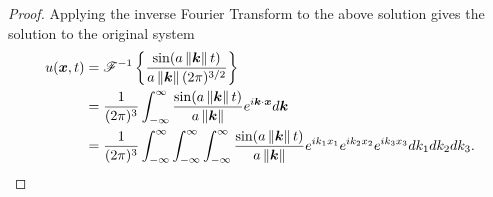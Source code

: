 \begin{proof}
  Applying the inverse Fourier Transform to the above solution gives the solution to the original
  system
  \begin{align*}
    u(\boldsymbol{x}, t) &= \mathscr{F}^{-1}\left\{ {\frac{\sin(a\left\Vert {\boldsymbol{k}} \right\Vert t)}{a\left\Vert {\boldsymbol{k}} \right\Vert(2\pi)^{3/2}}} \right\}\\
    &= \frac{1}{(2\pi)^3}\int_{-\infty}^\infty \frac{\sin(a\left\Vert {\boldsymbol{k}} \right\Vert t)}{a\left\Vert {\boldsymbol{k}} \right\Vert} e^{i\boldsymbol{k}\cdot \boldsymbol{x}} d\boldsymbol{k} \\
    &= \frac{1}{(2\pi)^3}\int_{-\infty}^\infty\int_{-\infty}^\infty\int_{-\infty}^\infty \frac{\sin(a\left\Vert {\boldsymbol{k}} \right\Vert t)}{a\left\Vert {\boldsymbol{k}} \right\Vert} e^{ik_1 x_1} e^{ik_2 x_2} e^{ik_3 x_3}dk_1 dk_2 dk_3 .
  \end{align*}
\end{proof}
\newpage
